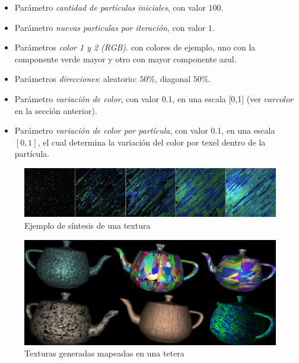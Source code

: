 \documentclass[spanish,a4paper,11pt,oneside,links]{report}
\begin{document}
\begin{itemize}
\item Par\'ametro {\em cantidad de part\'iculas iniciales}, con valor $100$.
\item Par\'ametro {\em nuevas particulas por iteraci\'on}, con valor $1$.
\item Par\'ametros {\em color 1 y 2 (RGB)}. con colores de ejemplo, uno con la componente verde mayor y otro con mayor componente azul.
\item Par\'ametros {\em direcciones}: aleatorio: $50\%$, diagonal $50\%$.
\item Par\'ametro {\em variaci\'on de color}, con valor 0.1, en una escala [0,1] (ver $varcolor$ en la secci\'on anterior).
\item Par\'ametro {\em variaci\'on de color por part\'icula}, con valor 0.1, en una escala $[0,1]$, el cual determina la variaci\'on del color por texel dentro de la part\'icula.
\end{itemize}

\begin{figure}[t!]
\centering
\includegraphics[scale=0.12]{sintesis}
\caption{Ejemplo de s\'intesis de una textura}
\label{sintesis}
\end{figure}

\begin{figure}[t!]
\centering
\includegraphics[scale=0.14]{teteras}
\caption{Texturas generadas mapeadas en una tetera}
\label{teteras}
\end{figure}
\end{document}
